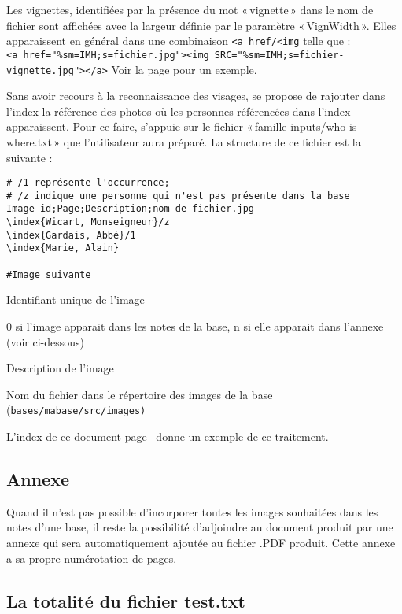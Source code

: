 Les vignettes, identifiées par la présence du mot «\,vignette\,» dans
le nom de fichier sont affichées avec la largeur définie par le paramètre
«\,VignWidth\,». Elles apparaissent en général dans une combinaison
\verb|<a href/<img| telle que : \\
\verb|<a href="%sm=IMH;s=fichier.jpg"><img SRC="%sm=IMH;s=fichier-vignette.jpg"></a>|
Voir la page \pageref{leondupont} pour un exemple.

Sans avoir recours à la reconnaissance des visages, \gwtol{} se propose de
rajouter dans l'index la référence des photos où les personnes référencées
dans l'index apparaissent. Pour ce faire, \gwtol{} s'appuie sur le fichier
«\,famille-inputs/who-is-where.txt\,» que l'utilisateur aura préparé.
La structure de ce fichier est la suivante :

\begin{verbatim}
# /1 représente l'occurrence;
# /z indique une personne qui n'est pas présente dans la base
Image-id;Page;Description;nom-de-fichier.jpg
\index{Wicart, Monseigneur}/z
\index{Gardais, Abbé}/1
\index{Marie, Alain}

#Image suivante
\end{verbatim}
\begin{description}[style=nextline]
\item[Image-id] Identifiant unique de l'image
\item[Page] 0 si l'image apparait dans les notes de la base, n si elle apparait
dans l'annexe (voir ci-dessous)
\item[Description] Description de l'image
\item[Nom-de-fichier] Nom du fichier dans le répertoire des images de la base
(\tt{bases/mabase/src/images})
\end{description}

L'index de ce document page~\pageref{index} donne un exemple de ce traitement.

\subsection{Annexe}
\label{annexe}
Quand il n'est pas possible d'incorporer toutes les images souhaitées dans les
notes d'une base, il reste la possibilité d'adjoindre au document produit par
\gwtol{} une annexe qui sera automatiquement ajoutée au fichier .PDF produit.
Cette annexe a sa propre numérotation de pages.

\subsection{La totalité du fichier test.txt}

